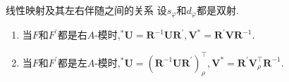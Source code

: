 \begin{proposition}{线性映射及其左右伴随之间的关系}{}
	设$s_{\varphi}$和$d_{\varphi}$都是双射.
	\begin{enumerate}
		\item 当$F$和$F^{\prime}$都是右$A$-模时,$^{\ast}\boldsymbol{U}=\boldsymbol{R}^{-1}\boldsymbol{U}\boldsymbol{R}^{\prime},\boldsymbol{V}^{\ast}=\boldsymbol{R}^{\prime}\boldsymbol{V}\boldsymbol{R}^{-1}$.
		\item 当$F$和$F^{\prime}$都是左$A$-模时,$^{\ast}\boldsymbol{U}=\left(\boldsymbol{R}^{-1}\boldsymbol{U}\boldsymbol{R}^{\prime}\right)_{\rho}^{\top},\boldsymbol{V}^{\ast}=\boldsymbol{R}^{\prime}\boldsymbol{V}_{\rho}^{\top}\boldsymbol{R}^{-1}$.
	\end{enumerate}
\end{proposition}


